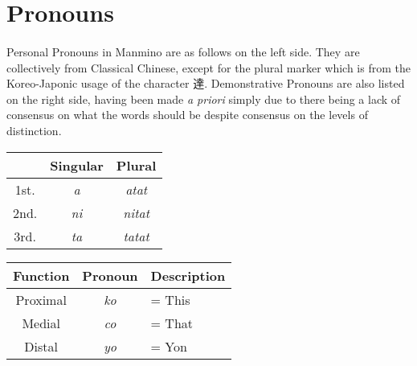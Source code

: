 \documentclass{book}
\begin{document}
    \section{Pronouns}
    \paragraph{}
    Personal Pronouns in Manmino are as follows on the left side. They are collectively from Classical Chinese, except for the plural marker which is from the Koreo-Japonic usage of the character 達. Demonstrative Pronouns are also listed on the right side, having been made \textit{a priori} simply due to there being a lack of consensus on what the words should be despite consensus on the levels of distinction.
        \begin{center}\footnotesize{}
            \begin{tabular}{|c|c|c|} \hline
                 & Singular & Plural \\ \hline
               1st. & \textit{a} & \textit{atat} \\ \hline
               2nd. & \textit{ni} & \textit{nitat} \\ \hline
                 3rd. & \textit{ta} & \textit{tatat} \\ \hline
            \end{tabular}
            \begin{tabular}{|c|c|l|} \hline
                Function &  Pronoun & Description\\ \hline
                Proximal & \textit{ko} & = This \\ \hline
                Medial  & \textit{co} & = That\\ \hline
                Distal  & \textit{yo} & = Yon \\ \hline
            \end{tabular}
        \end{center} 
\end{document}
